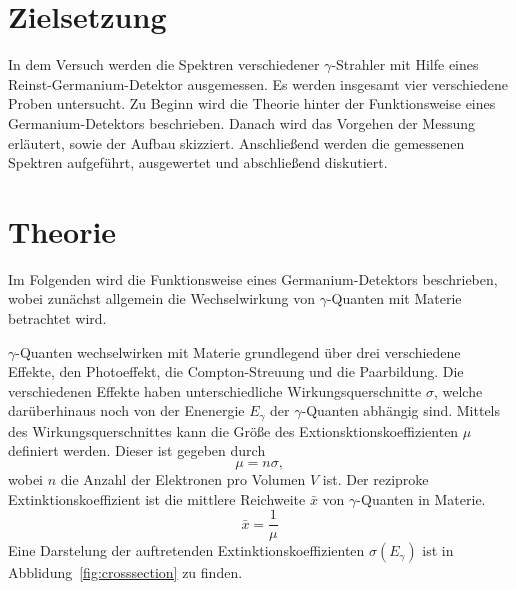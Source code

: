 \section{Zielsetzung}
\label{sec:zielsetzung}

In dem Versuch werden die Spektren verschiedener $\gamma$-Strahler mit Hilfe
eines Reinst-Germanium-Detektor ausgemessen. Es werden insgesamt vier verschiedene
Proben untersucht. Zu Beginn wird die Theorie hinter der Funktionsweise eines Germanium-Detektors
beschrieben. Danach wird das Vorgehen der Messung erläutert, sowie der Aufbau
skizziert. Anschließend werden die gemessenen Spektren aufgeführt, ausgewertet und
abschließend diskutiert.

\section{Theorie}
\label{sec:theorie}

Im Folgenden wird die Funktionsweise eines Germanium-Detektors beschrieben,
wobei zunächst allgemein die Wechselwirkung von $\gamma$-Quanten mit Materie
betrachtet wird.

$\gamma$-Quanten wechselwirken mit Materie grundlegend über drei verschiedene Effekte,
den Photoeffekt, die Compton-Streuung und die Paarbildung.
Die verschiedenen Effekte haben unterschiedliche Wirkungsquerschnitte $\sigma$,
welche darüberhinaus noch von der Enenergie $E_{\gamma}$ der $\gamma$-Quanten abhängig sind.
Mittels des Wirkungsquerschnittes kann die Größe des Extionsktionskoeffizienten $\mu$
definiert werden. Dieser ist gegeben durch
\begin{equation}
  \label{eqn:ext}
  \mu = n\sigma,
\end{equation}
wobei $n$ die Anzahl der Elektronen pro Volumen $V$ ist.
Der reziproke Extinktionskoeffizient ist die mittlere Reichweite $\bar{x}$
von $\gamma$-Quanten in Materie.
\begin{equation}
  \bar{x} = \frac{1}{\mu}
\end{equation}
Eine Darstelung der auftretenden Extinktionskoeffizienten $\sigma(E_{\gamma})$ ist in
Abblidung~\ref{fig:crosssection} zu finden.

